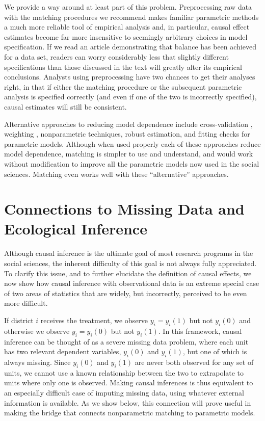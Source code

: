 \documentclass[11pt,titlepage]{article}
\begin{document}
We provide a way around at least part of this problem.  Preprocessing
raw data with the matching procedures we recommend makes familiar
parametric methods a much more reliable tool of empirical analysis
and, in particular, causal effect estimates become far more
insensitive to seemingly arbitrary choices in model specification.  If
we read an article demonstrating that balance has been achieved for a
data set, readers can worry considerably less that slightly different
specifications than those discussed in the text will greatly alter its
empirical conclusions.  Analysts using preprocessing have two chances
to get their analyses right, in that if either the matching procedure
or the subsequent parametric analysis is specified correctly (and even
if one of the two is incorrectly specified), causal estimates will
still be consistent.

Alternative approaches to reducing model dependence include
cross-validation \citep{BlaSmi04}, weighting \citep{RobRot03,
  HirImbRid03}, nonparametric techniques, robust estimation, and
fitting checks for parametric models.  Although when used properly
each of these approaches reduce model dependence, matching is simpler
to use and understand, and would work without modification to improve
all the parametric models now used in the social sciences.  Matching
even works well with these ``alternative'' approaches.

\appendix

\section{Connections to Missing Data and Ecological
  Inference}\label{s:connect}

Although causal inference is the ultimate goal of most research
programs in the social sciences, the inherent difficulty of this goal
is not always fully appreciated.  To clarify this issue, and to
further elucidate the definition of causal effects, we now show how
causal inference with observational data is an extreme special case of
two areas of statistics that are widely, but incorrectly, perceived to
be even more difficult.

If district $i$ receives the treatment, we observe $y_i=y_i(1)$ but
not $y_i(0)$ and otherwise we observe $y_i=y_i(0)$ but not $y_i(1)$.
In this framework, causal inference can be thought of as a severe
missing data problem, where each unit has two relevant dependent
variables, $y_i(0)$ and $y_i(1)$, but one of which is always missing.
Since $y_i(0)$ and $y_i(1)$ are never both observed for any set of
units, we cannot use a known relationship between the two to
extrapolate to units where only one is observed.  Making causal
inferences is thus equivalent to an especially difficult case of
imputing missing data, using whatever external information is
available.  As we show below, this connection will prove useful in
making the bridge that connects nonparametric matching to parametric
models.
\end{document}
